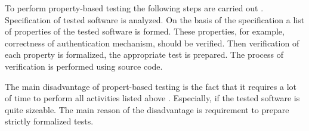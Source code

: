 %
To perform property-based testing the following steps are carried out . 
%
Specification of tested software is analyzed. 
%
On the basis of the specification a list of properties of the tested software is formed. 
%
These properties, for example, correctness of authentication mechanism, should be verified. 
%
Then verification of each property is formalized, the appropriate test is prepared. 
%
The process of verification is performed using source code. 

%
The main disadvantage of propert-based testing is the fact that it requires a lot of time to perform all activities listed above . 
%
Especially, if the tested software is quite sizeable. 
%
The main reason of the disadvantage is \The requirement to prepare strictly formalized tests.